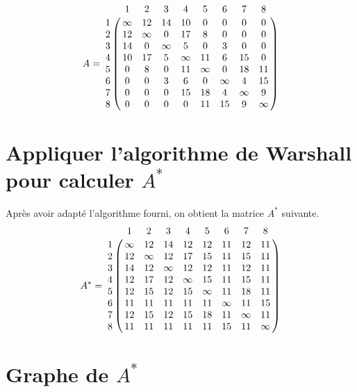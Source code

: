 \documentclass{article}
\begin{document}
$$
A = \bordermatrix{
    & 1 & 2 & 3 & 4 & 5 & 6 & 7 & 8 \cr
  1 & \infty & 12 & 14 & 10 & 0 & 0 & 0 & 0 \cr
  2 & 12 & \infty & 0 & 17 & 8 & 0 & 0 & 0 \cr
  3 & 14 & 0 & \infty & 5 & 0 & 3 & 0 & 0 \cr
  4 & 10 & 17 & 5 & \infty & 11 & 6 & 15 & 0 \cr
  5 & 0 & 8 & 0 & 11 & \infty & 0 & 18 & 11 \cr
  6 & 0 & 0 & 3 & 6 & 0 & \infty & 4 & 15 \cr
  7 & 0 & 0 & 0 & 15 & 18 & 4 & \infty & 9 \cr
  8 & 0 & 0 & 0 & 0 & 11 & 15 & 9 & \infty
}
$$

\section{Appliquer l'algorithme de Warshall pour calculer $A^*$}

Après avoir adapté l'algorithme fourni, on obtient la matrice $A^*$
suivante.\\

$$
A^* = \bordermatrix{
    & 1 & 2 & 3 & 4 & 5 & 6 & 7 & 8 \cr
  1 & \infty & 12 & 14 & 12 & 12 & 11 & 12 & 11 \cr
  2 & 12 & \infty & 12 & 17 & 15 & 11 & 15 & 11 \cr
  3 & 14 & 12 & \infty & 12 & 12 & 11 & 12 & 11 \cr
  4 & 12 & 17 & 12 & \infty & 15 & 11 & 15 & 11 \cr
  5 & 12 & 15 & 12 & 15 & \infty & 11 & 18 & 11 \cr
  6 & 11 & 11 & 11 & 11 & 11 & \infty & 11 & 15 \cr
  7 & 12 & 15 & 12 & 15 & 18 & 11 & \infty & 11 \cr
  8 & 11 & 11 & 11 & 11 & 11 & 15 & 11 & \infty
}
$$

\section{Graphe de $A^*$}

\end{document}
